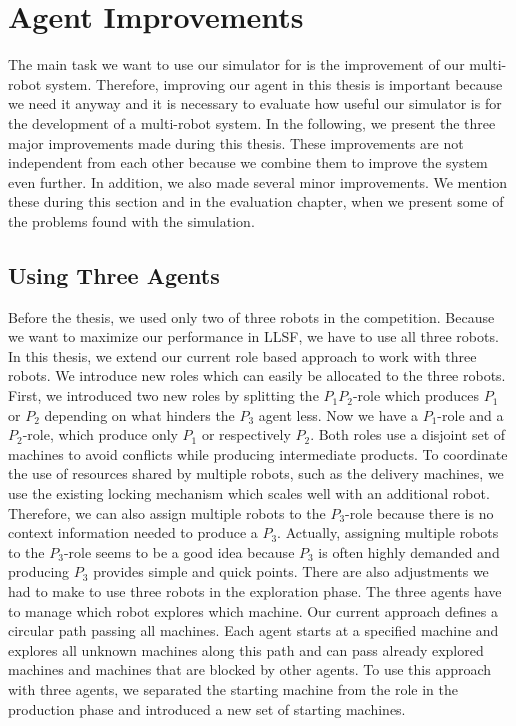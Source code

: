 \section{Agent Improvements}
\label{sec:agent_improvements}
The main task we want to use our simulator for is the improvement of our multi-robot system. Therefore, improving our agent in this thesis is important because we need it anyway and it is necessary to evaluate how useful our simulator is for the development of a multi-robot system. In the following, we present the three major improvements made during this thesis. These improvements are not independent from each other because we combine them to improve the system even further. In addition, we also made several minor improvements. We mention these during this section and in the evaluation chapter, when we present some of the problems found with the simulation.


\subsection{Using Three Agents}
Before the thesis, we used only two of three robots in the competition. Because we want to maximize our performance in LLSF, we have to use all three robots. In this thesis, we extend our current role based approach to work with three robots. We introduce new roles which can easily be allocated to the three robots.\\
First, we introduced two new roles by splitting the $P_1P_2$-role which produces $P_1$ or $P_2$ depending on what hinders the $P_3$ agent less. Now we have a $P_1$-role and a $P_2$-role, which produce only $P_1$ or respectively $P_2$. Both roles use a disjoint set of machines to avoid conflicts while producing intermediate products. To coordinate the use of resources shared by multiple robots, such as the delivery machines, we use the existing locking mechanism which scales well with an additional robot. Therefore, we can also assign multiple robots to the $P_3$-role because there is no context information needed to produce a $P_3$. Actually, assigning multiple robots to the $P_3$-role seems to be a good idea because $P_3$ is often highly demanded and producing $P_3$ provides simple and quick points. There are also adjustments we had to make to use three robots in the exploration phase. The three agents have to manage which robot explores which machine. Our current approach defines a circular path passing all machines. Each agent starts at a specified machine and explores all unknown machines along this path and can pass already explored machines and machines that are blocked by other agents. To use this approach with three agents, we separated the starting machine from the role in the production phase and introduced a new set of starting machines.

